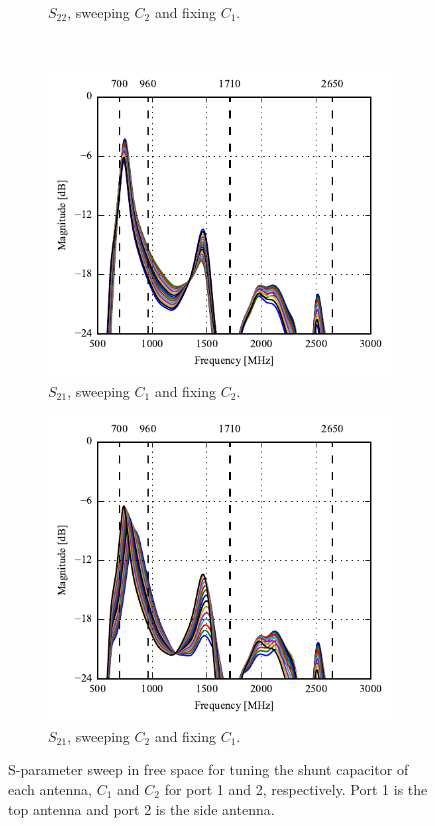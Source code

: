 \begin{figure}[htbp]
\begin{subfigure}[b]{0.49\linewidth}
        \caption{$S_{22}$, sweeping $C_2$ and fixing $C_1$.}
    \end{subfigure}
~
    \begin{subfigure}[b]{0.49\linewidth}
        \centering
        \includegraphics{img/tech_sol/monopole/s21-s11}
        \caption{$S_{21}$, sweeping $C_1$ and fixing $C_2$.}
    \end{subfigure}
    \hfill
    \begin{subfigure}[b]{0.49\linewidth}
        \centering
        \includegraphics{img/tech_sol/monopole/s21-s22}
        \caption{$S_{21}$, sweeping $C_2$ and fixing $C_1$.}
    \end{subfigure}
    \caption{S-parameter sweep in free space for tuning the shunt capacitor of each antenna, $C_1$ and $C_2$ for port 1 and 2, respectively. Port 1 is the top antenna and port 2 is the side antenna.}
    \label{fig:sparam_mono_free_space}
\end{figure}

